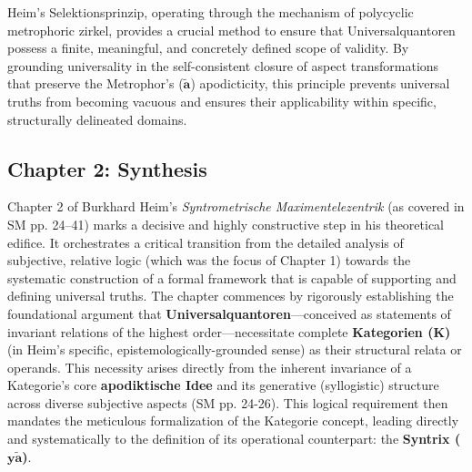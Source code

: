 \documentclass[12pt]{article}
\newcommand{\kategorie}{\bm{K}}
\newcommand{\syntrix}{\bm{y\widetilde{a}}}
\newcommand{\metrophor}{\bm{\widetilde{a}}}
\begin{document}
Heim's Selektionsprinzip, operating through the mechanism of polycyclic metrophoric zirkel, provides a crucial method to ensure that Universalquantoren possess a finite, meaningful, and concretely defined scope of validity. By grounding universality in the self-consistent closure of aspect transformations that preserve the Metrophor's (\(\metrophor\)) apodicticity, this principle prevents universal truths from becoming vacuous and ensures their applicability within specific, structurally delineated domains.

\subsection{Chapter 2: Synthesis}
\label{sec:chapter2_synthesis}

Chapter 2 of Burkhard Heim's \textit{Syntrometrische Maximentelezentrik} (as covered in SM pp. 24–41) marks a decisive and highly constructive step in his theoretical edifice. It orchestrates a critical transition from the detailed analysis of subjective, relative logic (which was the focus of Chapter 1) towards the systematic construction of a formal framework that is capable of supporting and defining universal truths. The chapter commences by rigorously establishing the foundational argument that \textbf{Universalquantoren}—conceived as statements of invariant relations of the highest order—necessitate complete \textbf{Kategorien (\(\kategorie\))} (in Heim's specific, epistemologically-grounded sense) as their structural relata or operands. This necessity arises directly from the inherent invariance of a Kategorie's core \textbf{apodiktische Idee} and its generative (syllogistic) structure across diverse subjective aspects (SM pp. 24-26). This logical requirement then mandates the meticulous formalization of the Kategorie concept, leading directly and systematically to the definition of its operational counterpart: the \textbf{Syntrix (\(\syntrix\))}.
\end{document}
